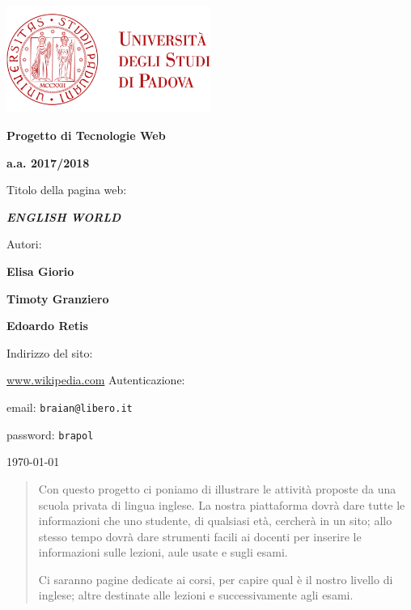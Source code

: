 \documentclass[12pt, a4paper]{article}
\begin{document}
\frenchspacing
\begin{titlepage}
	\centering
	\includegraphics[width=0.50\textwidth]{img/logo_unipd_color.png}\par\vspace{1cm} %
	
	{\LARGE\bfseries Progetto di Tecnologie Web \par}
	\vspace{1cm}
	
	{\Large\bfseries a.a. 2017/2018 \par}
	\vspace{1.5cm}
	
	{\Large Titolo della pagina web: \par}
	\vspace{0.5cm}
	
	{\LARGE\bfseries\itshape ENGLISH WORLD \par}
	
	\vfill 

	Autori: \par
	{\bfseries Elisa Giorio \par}
	{\bfseries Timoty Granziero \par}
	{\bfseries Edoardo Retis \par}
	
	\vfill

	Indirizzo del sito: \par
	\url{www.wikipedia.com}
	\vfill
	Autenticazione:\par
	email: \texttt{braian@libero.it}\par
	password: \texttt{brapol}
	\vfill
	
	{\large \today\par}
	
\end{titlepage}

\tableofcontents 
\pagebreak

\begin{abstract}
Con questo progetto ci poniamo di illustrare le attività proposte da una scuola privata di lingua inglese. La nostra piattaforma dovrà dare tutte le informazioni che uno studente, di qualsiasi età, cercherà in un sito; allo stesso tempo dovrà dare strumenti facili ai docenti per inserire le informazioni sulle lezioni, aule usate e sugli esami.\par
Ci saranno pagine dedicate ai corsi, per capire qual è il nostro livello di inglese; altre destinate alle lezioni e successivamente agli esami.
\end{abstract}
\end{document}
